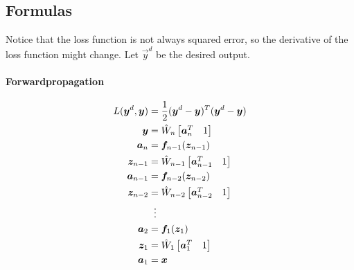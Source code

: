 	\subsection{Formulas}
		Notice that the loss function is not always squared error, so the derivative of the loss function might change. Let \(\vec{y}^d\) be the desired output.

		\paragraph{Forwardpropagation}
			\begin{align}
				L(\vec{y}^d, \vec{y}) & = \frac{1}{2} (\vec{y}^d - \vec{y})^T (\vec{y}^d - \vec{y})           \\
				\vec{y}               & = \hat{W}_n \begin{bmatrix} \vec{a}_n^T & 1 \end{bmatrix}             \\
				\vec{a}_n             & = \vec{f}_{n - 1} (\vec{z}_{n - 1})                                   \\
				\vec{z}_{n - 1}       & = \hat{W}_{n - 1} \begin{bmatrix} \vec{a}_{n - 1}^T & 1 \end{bmatrix} \\
				\vec{a}_{n - 1}       & = \vec{f}_{n - 2} (\vec{z}_{n - 2})                                   \\
				\vec{z}_{n - 2}       & = \hat{W}_{n - 2} \begin{bmatrix} \vec{a}_{n - 2}^T & 1 \end{bmatrix} \\
				                      & \hspace{0.2cm}\vdots                                                  \\
				\vec{a}_2             & = \vec{f}_1(\vec{z}_1)                                                \\
				\vec{z}_1             & = \hat{W}_1 \begin{bmatrix} \vec{a}_1^T & 1 \end{bmatrix}             \\
				\vec{a}_1             & = \vec{x}
			\end{align}

